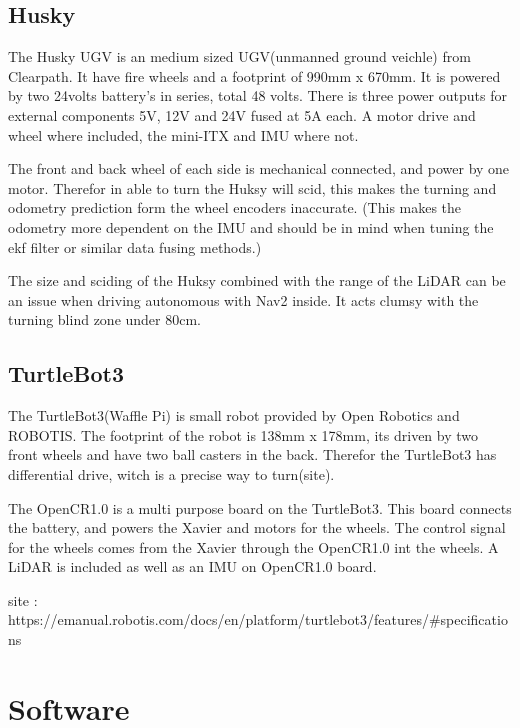 \subsection{Husky}
The Husky UGV is an medium sized UGV(unmanned ground veichle) from Clearpath. It have fire wheels and a footprint of 990mm x 670mm. It is powered by two 24volts battery's in series, total 48 volts. There is three power outputs for external components 5V, 12V and 24V fused at 5A each. A motor drive and wheel where included, the mini-ITX and IMU where not. 

The front and back wheel of each side is mechanical connected, and power by one motor. Therefor in able to turn the Huksy will scid, this makes the turning and odometry prediction form the wheel encoders inaccurate. 
(This makes the odometry more dependent on the IMU and should be in mind when tuning the ekf filter or similar data fusing methods.) 

The size and sciding of the Huksy combined with the range of the LiDAR can be an issue when driving autonomous with Nav2 inside. It acts clumsy with the turning blind zone under 80cm. 

\subsection{TurtleBot3}
The TurtleBot3(Waffle Pi) is small robot provided by Open Robotics and ROBOTIS. The footprint of the robot is 138mm x 178mm, its driven by two front wheels and have two ball casters in the back. Therefor the TurtleBot3 has differential drive, witch is a precise way to turn(site). 

The OpenCR1.0 is a multi purpose board on the TurtleBot3. This board connects the battery, and powers the Xavier and motors for the wheels. The control signal for the wheels comes from the Xavier through the OpenCR1.0 int the wheels. 
A LiDAR is included as well as an IMU on OpenCR1.0 board.

site : 
https://emanual.robotis.com/docs/en/platform/turtlebot3/features/#specifications

\subsection{}

\section{Software}

